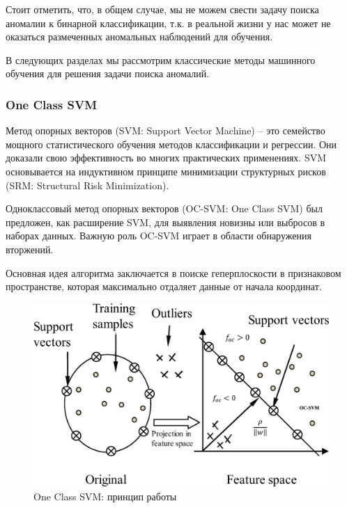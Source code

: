 \documentclass[12pt]{article}
\begin{document}
    \par Стоит отметить, что, в общем случае, мы не можем свести задачу поиска аномалии к бинарной классификации, т.к. в реальной жизни у нас может не оказаться размеченных аномальных наблюдений для обучения.

    \par В следующих разделах мы рассмотрим классические методы машинного обучения для решения задачи поиска аномалий.


    \subsubsection{One Class SVM}
    \label{sec:Research:Model:OneClassSVM}

    \par Метод опорных векторов (SVM: Support Vector Machine) \cite{SVM} -- это семейство мощного статистического обучения методов классификации и регрессии. Они доказали свою эффективность во многих практических применениях. SVM основывается на индуктивном принципе минимизации структурных рисков (SRM: Structural Risk Minimization).

    \par Одноклассовый метод опорных векторов (OC-SVM: One Class SVM) \cite{OC-SVM} был предложен, как расширение SVM, для выявления новизны или выбросов в наборах данных. Важную роль OC-SVM играет в области обнаружения вторжений.

    \par Основная идея алгоритма заключается в поиске геперплоскости в признаковом пространстве, которая максимально отдаляет данные от начала координат.

    \begin{figure}[h!]
        \centering
        \includegraphics[width=0.8\linewidth]{OneClassSVM.png}
        \caption{One Class SVM: принцип работы}
        \label{sec:Research:Model:OneClassSVM:fig:OneClassSVM}
    \end{figure}
\end{document}
